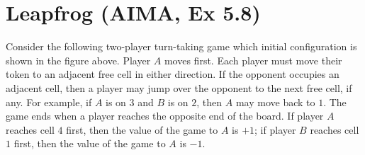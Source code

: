 \documentclass[11pt, a4paper]{article}
\begin{document}
\newpage

\section{Leapfrog (AIMA, Ex 5.8)}

\begin{figure}[h]
    \centering
\end{figure}

Consider the following two-player turn-taking game which initial configuration is shown in the figure above. Player $A$ moves first. Each player must move their token to an adjacent free cell in either direction. If the opponent occupies an adjacent cell, then a player may jump over the opponent to the next free cell, if any. For example, if $A$ is on $3$ and $B$ is on $2$, then $A$ may move back to $1$. The game ends when a player reaches the opposite end of the board. If player $A$ reaches cell $4$ first, then the value of the game to $A$ is $+1$; if player $B$ reaches cell $1$ first, then the value of the game to $A$ is $-1$.
\end{document}

